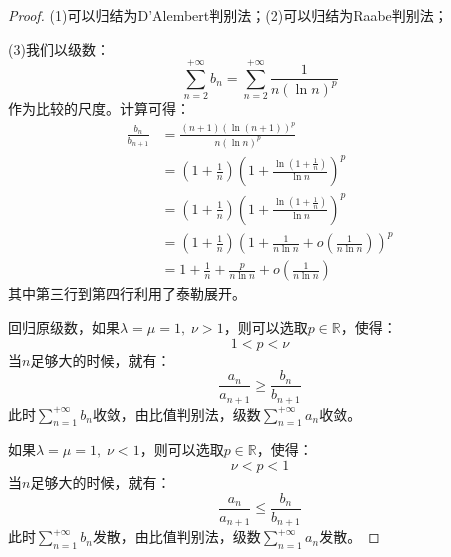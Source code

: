 \begin{proof}
	(1)可以归结为D'Alembert判别法；(2)可以归结为Raabe判别法；\par
	(3)我们以级数：
	\begin{equation*}
		\sum\limits_{n=2}^{+\infty}b_n=\sum\limits_{n=2}^{+\infty}\frac{1}{n(\ln n)^p}
	\end{equation*}
	作为比较的尺度。计算可得：
	\begin{align*}
		\frac{b_n}{b_{n+1}}
		&=\frac{(n+1)(\ln(n+1))^p}{n(\ln n)^p} \\
		&=\left(1+\frac{1}{n}\right)\left(1+\frac{\ln(1+\frac{1}{n})}{\ln n}\right)^p \\
		&=\left(1+\frac{1}{n}\right)\left(1+\frac{\ln(1+\frac{1}{n})}{\ln n}\right)^p \\
		&=\left(1+\frac{1}{n}\right)\left(1+\frac{1}{n\ln n}+o(\frac{1}{n\ln n})\right)^p \\
		&=1+\frac{1}{n}+\frac{p}{n\ln n}+o\left(\frac{1}{n\ln n}\right)
	\end{align*}
	其中第三行到第四行利用了泰勒展开。\par
	回归原级数，如果$\lambda=\mu=1,\;\nu>1$，则可以选取$p\in\mathbb{R}$，使得：
	\begin{equation*}
		1<p<\nu
	\end{equation*}
	当$n$足够大的时候，就有：
	\begin{equation*}
		\frac{a_n}{a_{n+1}}\geqslant\frac{b_n}{b_{n+1}}
	\end{equation*}
	此时$\sum\limits_{n=1}^{+\infty}b_n$收敛，由比值判别法，级数$\sum\limits_{n=1}^{+\infty}a_n$收敛。\par
	如果$\lambda=\mu=1,\;\nu<1$，则可以选取$p\in\mathbb{R}$，使得：
	\begin{equation*}
		\nu<p<1
	\end{equation*}
	当$n$足够大的时候，就有：
	\begin{equation*}
		\frac{a_n}{a_{n+1}}\leqslant\frac{b_n}{b_{n+1}}
	\end{equation*}
	此时$\sum\limits_{n=1}^{+\infty}b_n$发散，由比值判别法，级数$\sum\limits_{n=1}^{+\infty}a_n$发散。
\end{proof}







